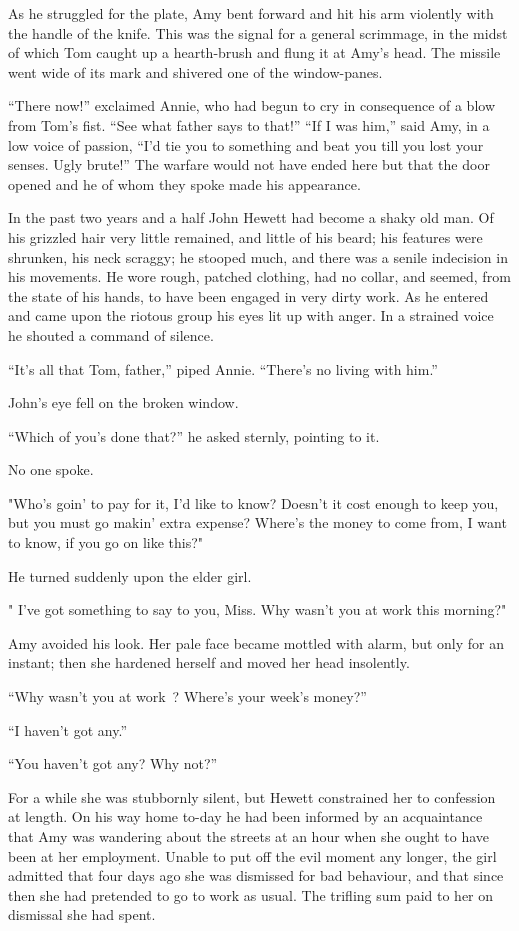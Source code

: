 As he struggled for the plate, Amy bent forward and hit his arm
violently with the handle of the knife. This was the signal for a
general scrimmage, in the midst of which Tom caught up a hearth-brush
and flung it at Amy's head. The missile went wide of its mark and
shivered one of the window-panes.

``There now!'' exclaimed Annie, who had begun to cry in consequence of a
blow from Tom's fist. ``See what father says to that!''
{\protect\hypertarget{255}{}{}} ``If I was him,'' said Amy, in a low
voice of passion, ``I'd tie you to something and beat you till you lost
your senses. Ugly brute!'' The warfare would not have ended here but
that the door opened and he of whom they spoke made his appearance.

In the past two years and a half John Hewett had become a shaky old man.
Of his grizzled hair very little remained, and little of his beard; his
features were shrunken, his neck scraggy; he stooped much, and there was
a senile indecision in his movements. He wore rough, patched clothing,
had no collar, and seemed, from the state of his hands, to have been
engaged in very dirty work. As he entered and came upon the riotous
group his eyes lit up with anger. In a strained voice he shouted a
command of silence.

``It's all that Tom, father,'' piped Annie. ``There's no living with
him.''

John's eye fell on the broken window.

``Which of you's done that?'' he asked sternly, pointing to it.

No one spoke.

"Who's goin' to pay for it, I'd like to know? Doesn't it cost enough to
keep you, {\protect\hypertarget{256}{}{}} but you must go makin' extra
expense? Where's the money to come from, I want to know, if you go on
like this?"

He turned suddenly upon the elder girl.

" I've got something to say to you, Miss. Why wasn't you at work this
morning?"

Amy avoided his look. Her pale face became mottled with alarm, but only
for an instant; then she hardened herself and moved her head insolently.

``Why wasn't you at work~? Where's your week's money?''

``I haven't got any.''

``You haven't got any? Why not?''

For a while she was stubbornly silent, but Hewett constrained her to
confession at length. On his way home to-day he had been informed by an
acquaintance that Amy was wandering about the streets at an hour when
she ought to have been at her employment. Unable to put off the evil
moment any longer, the girl admitted that four days ago she was
dismissed for bad behaviour, and that since then she had pretended to go
to work as usual. The trifling sum paid to her on dismissal she had
spent.

